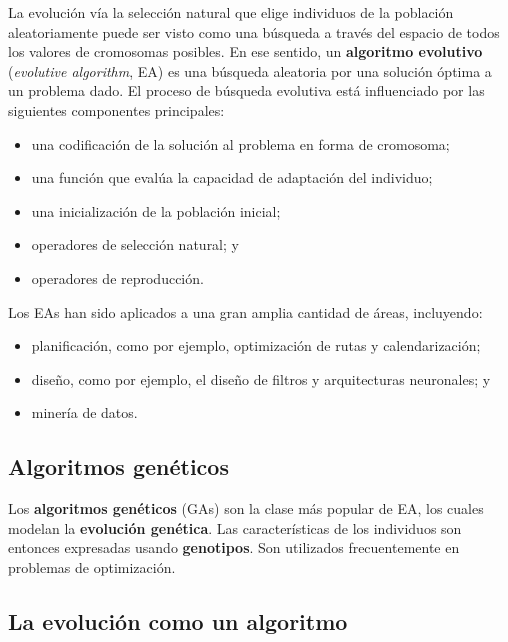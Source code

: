 \documentclass[10pt,a4paper]{article}
\begin{document}
La evolución vía la selección natural que elige individuos de la población aleatoriamente puede ser visto como una búsqueda a través del espacio de todos los valores de cromosomas posibles. En ese sentido, un \textbf{algoritmo evolutivo} (\textit{evolutive algorithm}, EA) es una búsqueda aleatoria por una solución óptima a un problema dado. El proceso de búsqueda evolutiva está influenciado por las siguientes componentes principales:
\begin{itemize}
\item una codificación de la solución al problema en forma de cromosoma;
\item una función que evalúa la capacidad de adaptación del individuo;
\item una inicialización de la población inicial;
\item operadores de selección natural; y 
\item operadores de reproducción.
\end{itemize}

Los EAs han sido aplicados a una gran amplia cantidad de áreas, incluyendo:
\begin{itemize}
\item planificación, como por ejemplo, optimización de rutas y calendarización;
\item diseño, como por ejemplo, el diseño de filtros y arquitecturas neuronales; y
\item minería de datos.
\end{itemize}

\subsection{Algoritmos genéticos}

Los \textbf{algoritmos genéticos} (GAs) son la clase más popular de EA, los cuales modelan la \textbf{evolución genética}. Las características de los individuos son entonces expresadas usando \textbf{genotipos}. Son utilizados frecuentemente en problemas de optimización.

\subsection{La evolución como un algoritmo}
\end{document}
